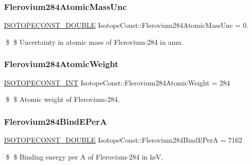 \subsubsection{\texorpdfstring{Flerovium284\+Atomic\+Mass\+Unc}{Flerovium284AtomicMassUnc}}
{\footnotesize\ttfamily \mbox{\hyperlink{group___isotope_const-_macros_ga8f45a7272ce02c0b4c65c44636ed719a}{I\+S\+O\+T\+O\+P\+E\+C\+O\+N\+S\+T\+\_\+\+D\+O\+U\+B\+LE}} Isotope\+Const\+::\+Flerovium284\+Atomic\+Mass\+Unc = 0.}

\$ \$ Uncertainty in atomic mass of Flerovium-\/284 in amu. \mbox{\label{group___isotope_const-_flerovium-_fl284_ga4d78c8f39ced34fb69a560b4132d83ca}} 
\subsubsection{\texorpdfstring{Flerovium284\+Atomic\+Weight}{Flerovium284AtomicWeight}}
{\footnotesize\ttfamily \mbox{\hyperlink{group___isotope_const-_macros_ga5f18360b3e99483a35c32d789e62621c}{I\+S\+O\+T\+O\+P\+E\+C\+O\+N\+S\+T\+\_\+\+I\+NT}} Isotope\+Const\+::\+Flerovium284\+Atomic\+Weight = 284}

\$ \$ Atomic weight of Flerovium-\/284. \mbox{\label{group___isotope_const-_flerovium-_fl284_ga9a7c40b59e37157d8cc1348af427423a}} 
\subsubsection{\texorpdfstring{Flerovium284\+Bind\+E\+PerA}{Flerovium284BindEPerA}}
{\footnotesize\ttfamily \mbox{\hyperlink{group___isotope_const-_macros_ga8f45a7272ce02c0b4c65c44636ed719a}{I\+S\+O\+T\+O\+P\+E\+C\+O\+N\+S\+T\+\_\+\+D\+O\+U\+B\+LE}} Isotope\+Const\+::\+Flerovium284\+Bind\+E\+PerA = 7162}

\$ \$ Binding energy per A of Flerovium-\/284 in keV. \mbox{\label{group___isotope_const-_flerovium-_fl284_gade62ea43cef5a14653053a28bb0e0571}} 
